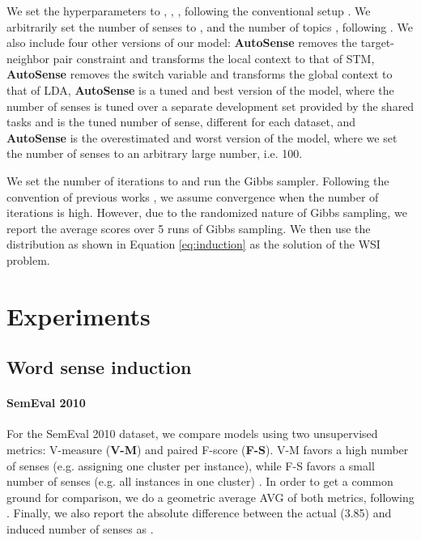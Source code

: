 \documentclass[letterpaper]{article} \usepackage{aaai19}
\begin{document}
We set the hyperparameters to , , , following the conventional setup \cite{griffiths2004finding,chemudugunta2006modeling}. We arbitrarily set the number of senses to , and the number of topics , following \cite{wang2015sense}. We also include four other versions of our model: 
\textbf{AutoSense} removes the target-neighbor pair constraint and transforms the local context to that of STM,
\textbf{AutoSense} removes the switch variable and transforms the global context to that of LDA,
\textbf{AutoSense} is a tuned and best version of the model, where the number of senses is tuned over a separate development set provided by the shared tasks and  is the tuned number of sense, different for each dataset, and
\textbf{AutoSense} is the overestimated and worst version of the model, where we set the number of senses to an arbitrary large number, i.e. 100.

We set the number of iterations to  and run the Gibbs sampler. Following the convention of previous works \cite{lau2012word,goyal2014unsupervised,wang2015sense}, we assume convergence when the number of iterations is high. However, due to the randomized nature of Gibbs sampling, we report the average scores over 5 runs of Gibbs sampling. We then use the distribution  as shown in Equation \ref{eq:induction} as the solution of the WSI problem.

\section{Experiments} 

\subsection{Word sense induction} \label{sec:results}

\paragraph{SemEval 2010} 

For the SemEval 2010 dataset, we compare models using two unsupervised metrics: V-measure (\textbf{V-M}) and paired F-score (\textbf{F-S}). V-M favors a high number of senses (e.g. assigning one cluster per instance), while F-S favors a small number of senses (e.g. all instances in one cluster) \cite{manandhar2010semeval}. In order to get a common ground for comparison, we do a geometric average \textsc{AVG} of both metrics, following \cite{wang2015sense}. Finally, we also report the absolute difference between the actual (3.85) and induced number of senses as .
\end{document}
